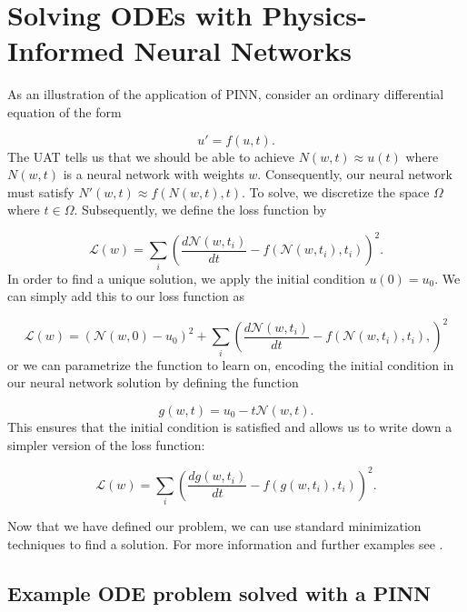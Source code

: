 \documentclass{CUP-JNL-DTM}%
\theoremstyle{definition}
\numberwithin{equation}{section}
\newcommand{\loss}{\mathcal{L}}
\newcommand{\net}{\mathcal{N}}
\begin{document}
\section{Solving ODEs with Physics-Informed Neural Networks}

As an illustration of the application of PINN, consider an ordinary differential equation of the form 

\begin{equation}
	u' = f(u,t). 
\end{equation}
The UAT tells us that we should be able to achieve $N(w,t) \approx u(t)$ where $N(w,t)$ is a neural network with weights $w$. Consequently, our neural network must satisfy $N'(w,t) \approx f(N(w,t), t)$. To solve, we discretize the space $\Omega$ where $t \in \Omega$. Subsequently, we define the loss function by 

\begin{equation}
	\loss(w) = \sum_i \left( \frac{d\net(w, t_i)}{dt} - f(\net(w,t_i), t_i)\right)^2. 
\end{equation}
In order to find a unique solution, we apply the initial condition $u(0) = u_0$. We can simply add this to our loss function as 

\begin{equation}
	\loss(w) = (\net(w,0) - u_0)^2 + \sum_i \left( \frac{d\net(w,t_i)}{dt} - f(\net(w,t_i), t_i),\right)^2
\end{equation}
or we can parametrize the function to learn on, encoding the initial condition in our neural network solution by defining the function 

\begin{equation}
	g(w,t) = u_0 - t\net(w,t).
\end{equation}
This ensures that the initial condition is satisfied and allows us to write down a simpler version of the loss function:

\begin{equation}
	\loss(w) = \sum_i \left(\frac{dg(w,t_i)}{dt} - f(g(w,t_i), t_i)\right)^2. 
\end{equation}

Now that we have defined our problem, we can use standard minimization techniques to find a solution. For more information and further examples see \cite{rackauckasSciMLSciMLBookParallel}. 

\subsection{Example ODE problem solved with a PINN}
	
\end{document}
